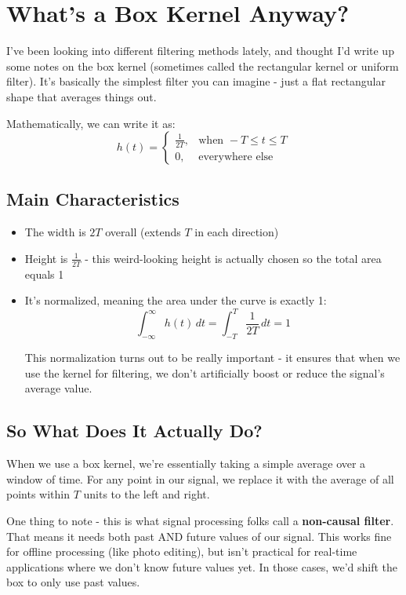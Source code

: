 \documentclass{article}
\begin{document}
\section{What's a Box Kernel Anyway?}

I've been looking into different filtering methods lately, and thought I'd write up some notes on the box kernel (sometimes called the rectangular kernel or uniform filter). It's basically the simplest filter you can imagine - just a flat rectangular shape that averages things out.

Mathematically, we can write it as:
\[
h(t) =
\begin{cases}
\frac{1}{2T}, & \text{when } -T \le t \le T \\
0, & \text{everywhere else}
\end{cases}
\]

\subsection*{Main Characteristics}

\begin{itemize}
    \item The width is $2T$ overall (extends $T$ in each direction)
    
    \item Height is $\frac{1}{2T}$ - this weird-looking height is actually chosen so the total area equals 1
    
    \item It's normalized, meaning the area under the curve is exactly 1:
    \[
    \int_{-\infty}^{\infty} h(t) \, dt = \int_{-T}^{T} \frac{1}{2T} \, dt = 1
    \]
    
    This normalization turns out to be really important - it ensures that when we use the kernel for filtering, we don't artificially boost or reduce the signal's average value.
\end{itemize}

\subsection*{So What Does It Actually Do?}

When we use a box kernel, we're essentially taking a simple average over a window of time. For any point in our signal, we replace it with the average of all points within $T$ units to the left and right.

One thing to note - this is what signal processing folks call a \textbf{non-causal filter}. That means it needs both past AND future values of our signal. This works fine for offline processing (like photo editing), but isn't practical for real-time applications where we don't know future values yet. In those cases, we'd shift the box to only use past values.
\end{document}
